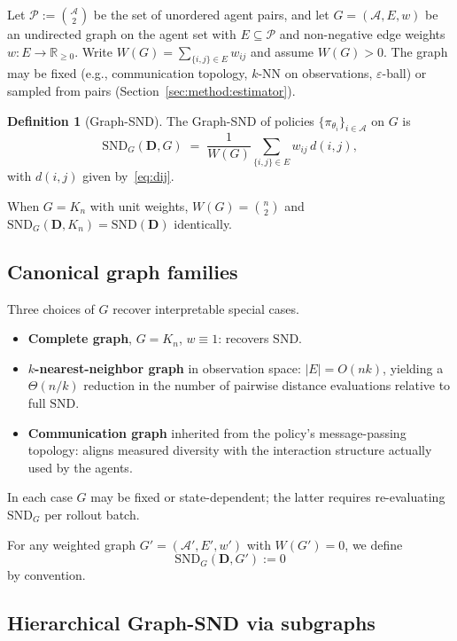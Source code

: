 \documentclass[11pt]{article}
\theoremstyle{plain}
\theoremstyle{definition}
\newtheorem{definition}[theorem]{Definition}
\theoremstyle{remark}
\newcommand{\R}{\mathbb{R}}
\newcommand{\Agents}{\mathcal{A}}        %
\newcommand{\Pairs}{\mathcal{P}}         %
\newcommand{\policy}[1]{\pi_{\theta_{#1}}}
\newcommand{\SND}{\ensuremath{\mathrm{SND}}}
\newcommand{\SNDG}{\mathrm{SND}_{G}}
\begin{document}
Let $\Pairs := \binom{\Agents}{2}$ be the set of unordered agent pairs,
and let $G = (\Agents, E, w)$ be an undirected graph on the agent set with
$E \subseteq \Pairs$ and non-negative edge weights $w : E \to \R_{\geq 0}$.
Write $W(G) = \sum_{\{i,j\} \in E} w_{ij}$ and assume $W(G) > 0$. The graph
may be fixed (e.g., communication topology, $k$-NN on observations,
$\varepsilon$-ball) or sampled from pairs
(Section~\ref{sec:method:estimator}).

\begin{definition}[Graph-SND]
\label{def:graph-snd}
The Graph-SND of policies $\{\policy{i}\}_{i \in \Agents}$ on $G$ is
\begin{equation}
\label{eq:graph-snd}
\SNDG(\mathbf{D}, G) \;=\; \frac{1}{W(G)}
\sum_{\{i,j\} \in E} w_{ij} \, d(i,j),
\end{equation}
with $d(i,j)$ given by~\eqref{eq:dij}.
\end{definition}

When $G = K_n$ with unit weights, $W(G) = \binom{n}{2}$ and
$\SNDG(\mathbf{D}, K_n) = \SND(\mathbf{D})$ identically.

\subsection{Canonical graph families}

Three choices of $G$ recover interpretable special cases.
\begin{itemize}
  \item \textbf{Complete graph}, $G = K_n$, $w \equiv 1$: recovers $\SND$.
  \item \textbf{$k$-nearest-neighbor graph} in observation space:
  $|E| = O(nk)$, yielding a $\Theta(n/k)$ reduction in the number of
  pairwise distance evaluations relative to full $\SND$.
  \item \textbf{Communication graph} inherited from the policy's message-passing topology: aligns measured diversity with the interaction
  structure actually used by the agents.
\end{itemize}
In each case $G$ may be fixed or state-dependent; the latter requires
re-evaluating $\SNDG$ per rollout batch.

For any weighted graph $G' = (\Agents', E', w')$ with $W(G') = 0$, we define
\[
\SNDG(\mathbf{D}, G') := 0
\]
by convention.

\subsection{Hierarchical Graph-SND via subgraphs}
\label{sec:method:hierarchical}
\end{document}
